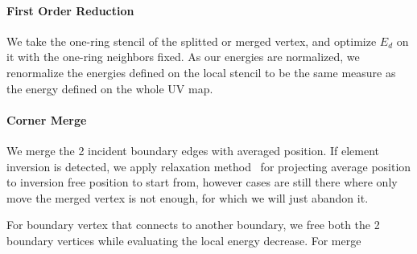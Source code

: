 \paragraph{First Order Reduction}
We take the one-ring stencil of the splitted or merged vertex, and optimize $E_d$ on it with the one-ring neighbors fixed. As our energies are normalized, we renormalize the energies defined on the local stencil to be the same measure as the energy defined on the whole UV map.

\paragraph{Corner Merge} We merge the 2 incident boundary edges with averaged position. If element inversion is detected, we apply relaxation method~\cite{Agmon1954Relaxation} for projecting average position to inversion free position to start from, however cases are still there where only move the merged vertex is not enough, for which we will just abandon it.

For boundary vertex that connects to another boundary, we free both the 2 boundary vertices while evaluating the local energy decrease. For merge